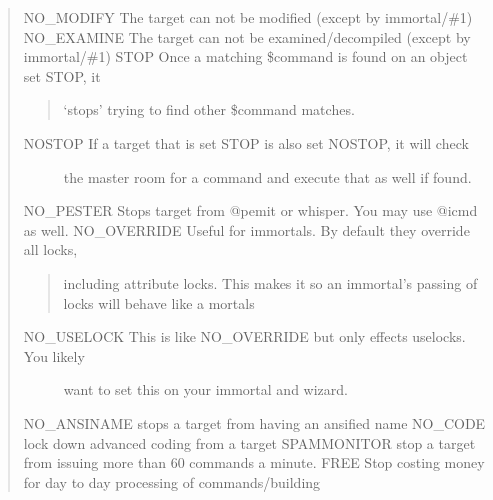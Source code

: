 \documentclass[letterpaper,10pt,english]{sphinxmanual}
\begin{document}
\begin{quote}
\sphinxAtStartPar
NO\_MODIFY  \sphinxhyphen{} The target can not be modified (except by immortal/\#1)
NO\_EXAMINE \sphinxhyphen{} The target can not be examined/decompiled (except by immortal/\#1)
STOP       \sphinxhyphen{} Once a matching \$command is found on an object set STOP, it
\begin{quote}

\sphinxAtStartPar
‘stops’ trying to find other \$command matches.
\end{quote}
\begin{description}
\item[{NOSTOP     \sphinxhyphen{} If a target that is set STOP is also set NOSTOP, it will check}] \leavevmode
\sphinxAtStartPar
the master room for a command and execute that as well if found.

\end{description}

\sphinxAtStartPar
NO\_PESTER  \sphinxhyphen{} Stops target from @pemit or whisper.  You may use @icmd as well.
NO\_OVERRIDE \sphinxhyphen{} Useful for immortals.  By default they override all locks,
\begin{quote}

\sphinxAtStartPar
including attribute locks.  This makes it so an immortal’s
passing of locks will behave like a mortals
\end{quote}
\begin{description}
\item[{NO\_USELOCK  \sphinxhyphen{} This is like NO\_OVERRIDE but only effects uselocks.  You likely}] \leavevmode
\sphinxAtStartPar
want to set this on your immortal and wizard.

\end{description}

\sphinxAtStartPar
NO\_ANSINAME \sphinxhyphen{} stops a target from having an ansified name
NO\_CODE     \sphinxhyphen{} lock down advanced coding from a target
SPAMMONITOR \sphinxhyphen{} stop a target from issuing more than 60 commands a minute.
FREE        \sphinxhyphen{} Stop costing money for day to day processing of commands/building
\end{quote}
\end{document}

